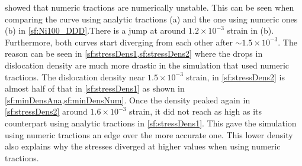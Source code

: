  showed that numeric tractions are numerically unstable. This can be seen when comparing the curve using analytic tractions (a) and the one using numeric ones (b) in \cref{sf:Ni100_DDD}.There is a jump at around $1.2\times 10^{-3}$ strain in (b). Furthermore, both curves start diverging from each other after $\sim 1.5\times 10^{-3}$. The reason can be seen in \cref{sf:stressDens1,sf:stressDens2} where the drops in dislocation density are much more drastic in the simulation that used numeric tractions. The dislocation density near $1.5\times 10^{-3}$ strain, in \cref{sf:stressDens2} is almost half of that in \cref{sf:stressDens1} as shown in \cref{sf:minDensAna,sf:minDensNum}. Once the density peaked again in \cref{sf:stressDens2} around $1.6\times 10^{-3}$ strain, it did not reach as high as its counterpart using analytic tractions in \cref{sf:stressDens1}. This gave the simulation using numeric tractions an edge over the more accurate one. This lower density also explains why the stresses diverged at higher values when using numeric tractions.

